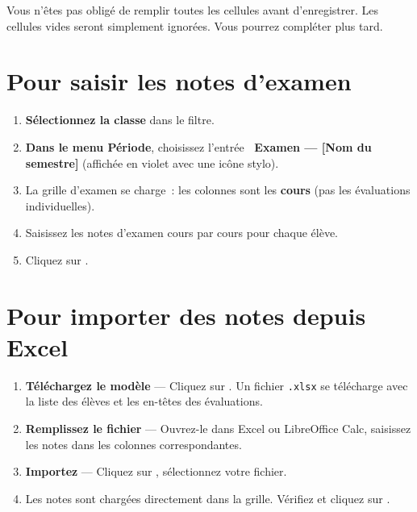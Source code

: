 \begin{astuce}
Vous n'\^etes pas oblig\'e de remplir toutes les cellules avant d'enregistrer. Les cellules vides seront simplement ignor\'ees. Vous pourrez compl\'eter plus tard.
\end{astuce}

\section{Pour saisir les notes d'examen}

\begin{etape}[title=Proc\'edure : Saisir les notes d'examen]
\begin{enumerate}[leftmargin=1.5cm,label=\textbf{\arabic*.},itemsep=10pt]
  \item \textbf{S\'electionnez la classe} dans le filtre.
  \item \textbf{Dans le menu P\'eriode}, choisissez l'entr\'ee \textbf{\faPencil\ Examen --- [Nom du semestre]} (affich\'ee en violet avec une ic\^one stylo).
  \item La grille d'examen se charge~: les colonnes sont les \textbf{cours} (pas les \'evaluations individuelles).
  \item Saisissez les notes d'examen cours par cours pour chaque \'el\`eve.
  \item Cliquez sur .
\end{enumerate}
\end{etape}

\section{Pour importer des notes depuis Excel}

\begin{etape}[title=Proc\'edure : Import Excel]
\begin{enumerate}[leftmargin=1.5cm,label=\textbf{\arabic*.},itemsep=10pt]
  \item \textbf{T\'el\'echargez le mod\`ele} --- Cliquez sur . Un fichier \texttt{.xlsx} se t\'el\'echarge avec la liste des \'el\`eves et les en-t\^etes des \'evaluations.
  \item \textbf{Remplissez le fichier} --- Ouvrez-le dans Excel ou LibreOffice Calc, saisissez les notes dans les colonnes correspondantes.
  \item \textbf{Importez} --- Cliquez sur , s\'electionnez votre fichier.
  \item Les notes sont charg\'ees directement dans la grille. V\'erifiez et cliquez sur .
\end{enumerate}
\end{etape}

